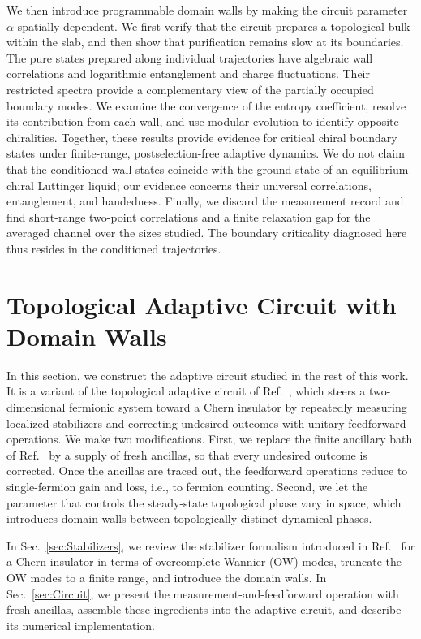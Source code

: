 \documentclass[aps,prb,10pt,twocolumn,superscriptaddress,longbibliography,floatfix]{revtex4-2}
\newcommand{\newtext}[1]{{\color{blue}#1}}
\newcommand{\claudeadd}[1]{{\color{orange}#1}}
\begin{document}
{\color{blue}
We then introduce programmable domain walls by making the circuit parameter $\alpha$ spatially dependent. We first verify that the circuit prepares a topological bulk within the slab, and then show that purification remains slow at its boundaries. The pure states prepared along individual trajectories have algebraic wall correlations and logarithmic entanglement and charge fluctuations. \newtext{Their restricted spectra provide a complementary view of the partially occupied boundary modes.} We examine the convergence of the entropy coefficient, resolve its contribution from each wall, and use modular evolution to identify opposite chiralities. Together, these results provide evidence for critical chiral boundary states under finite-range, postselection-free adaptive dynamics\claudeadd{. We do not claim that the conditioned wall states coincide with the ground state of an equilibrium chiral Luttinger liquid; our evidence concerns their universal correlations, entanglement, and handedness.} Finally, we discard the measurement record and find short-range two-point correlations and a finite relaxation gap for the averaged channel over the sizes studied. The boundary criticality diagnosed here thus resides in the conditioned trajectories.
}


\section{Topological Adaptive Circuit with Domain Walls}
\label{sec:Model}

In this section, we construct the adaptive circuit studied in the rest of this work. It is a variant of the topological adaptive circuit of Ref.~\cite{BhuiyanPanJian2026}, which steers a two-dimensional fermionic system toward a Chern insulator by repeatedly measuring localized stabilizers and correcting undesired outcomes with unitary feedforward operations. We make two modifications. First, we replace the finite ancillary bath of Ref.~\cite{BhuiyanPanJian2026} by a supply of fresh ancillas, so that every undesired outcome is corrected. Once the ancillas are traced out, the feedforward operations reduce to single-fermion gain and loss, i.e., to fermion counting. Second, we let the parameter \claudeadd{that} controls the steady-state topological phase vary in space, which introduces domain walls between topologically distinct dynamical phases.

In Sec.~\ref{sec:Stabilizers}, we review the stabilizer formalism introduced in Ref.~\cite{BhuiyanPanJian2026} for a Chern insulator in terms of overcomplete Wannier (OW) modes, truncate the OW modes to a finite range, and introduce the domain walls. In Sec.~\ref{sec:Circuit}, we present the measurement-and-feedforward operation with fresh ancillas, assemble these ingredients into the adaptive circuit, and describe its numerical implementation.
\end{document}
